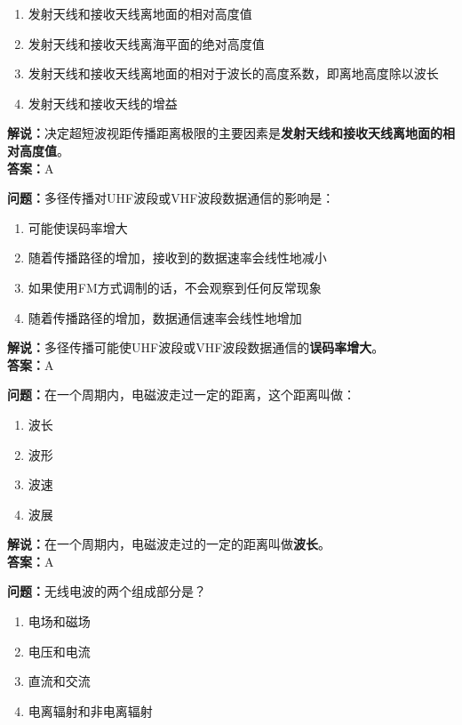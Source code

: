 \begin{enumerate}[label=\Alph*), leftmargin=1.5cm]
	\item 发射天线和接收天线离地面的相对高度值
	\item 发射天线和接收天线离海平面的绝对高度值
	\item 发射天线和接收天线离地面的相对于波长的高度系数，即离地高度除以波长
	\item 发射天线和接收天线的增益
\end{enumerate}

\textbf{解说：}决定超短波视距传播距离极限的主要因素是\textbf{发射天线和接收天线离地面的相对高度值}。\\\textbf{答案：}A%



\textbf{问题：}多径传播对UHF波段或VHF波段数据通信的影响是：

\begin{enumerate}[label=\Alph*), leftmargin=1.5cm]
	\item 可能使误码率增大
	\item 随着传播路径的增加，接收到的数据速率会线性地减小
	\item 如果使用FM方式调制的话，不会观察到任何反常现象
	\item 随着传播路径的增加，数据通信速率会线性地增加
\end{enumerate}

\textbf{解说：}多径传播可能使UHF波段或VHF波段数据通信的\textbf{误码率增大}。\\\textbf{答案：}A%



\textbf{问题：}在一个周期内，电磁波走过一定的距离，这个距离叫做：

\begin{enumerate}[label=\Alph*), leftmargin=1.5cm]
	\item 波长
	\item 波形
	\item 波速
	\item 波展
\end{enumerate}

\textbf{解说：}在一个周期内，电磁波走过的一定的距离叫做\textbf{波长}。\\\textbf{答案：}A%



\textbf{问题：}无线电波的两个组成部分是？

\begin{enumerate}[label=\Alph*), leftmargin=1.5cm]
	\item 电场和磁场
	\item 电压和电流
	\item 直流和交流
	\item 电离辐射和非电离辐射
\end{enumerate}


